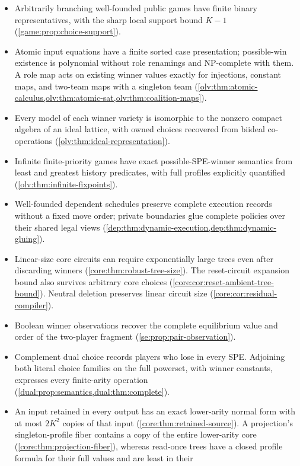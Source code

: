 \documentclass[11pt]{article}
\begin{document}
\begin{itemize}
\item Arbitrarily branching well-founded public games have finite binary
representatives, with the sharp local support bound $K-1$
(\cref{game:prop:choice-support}).
\item Atomic input equations have a finite sorted case presentation;
possible-win existence is polynomial without role renamings and NP-complete
with them. A role map acts on existing winner values exactly for injections,
constant maps, and two-team maps with a singleton team
(\cref{olv:thm:atomic-calculus,olv:thm:atomic-sat,olv:thm:coalition-maps}).
\item Every model of each winner variety is isomorphic to the nonzero
compact algebra of an ideal lattice, with owned choices recovered from
biideal co-operations (\cref{olv:thm:ideal-representation}).
\item Infinite finite-priority games have exact possible-SPE-winner
semantics from least and greatest history predicates, with full profiles
explicitly quantified (\cref{olv:thm:infinite-fixpoints}).
\item Well-founded dependent schedules preserve complete execution records
without a fixed move order; private boundaries glue complete policies
over their shared legal views
(\cref{dep:thm:dynamic-execution,dep:thm:dynamic-gluing}).
\item Linear-size core circuits can require exponentially large trees
even after discarding winners (\cref{core:thm:robust-tree-size}).
The reset-circuit expansion bound also survives arbitrary core choices
(\cref{core:cor:reset-ambient-tree-bound}).
Neutral deletion preserves linear circuit size
(\cref{core:cor:residual-compiler}).
\item Boolean winner observations recover the complete equilibrium value
and order of the two-player fragment (\cref{se:prop:pair-observation}).
\item Complement dual choice records players who lose in every SPE.
Adjoining both literal choice families on the full powerset, with
winner constants, expresses every finite-arity operation
(\cref{dual:prop:semantics,dual:thm:complete}).
\item An input retained in every output has an exact lower-arity normal
form with at most $2K^2$ copies of that input
(\cref{core:thm:retained-source}).
A projection's singleton-profile fiber contains a copy of the entire
lower-arity core (\cref{core:thm:projection-fiber}), whereas read-once trees
have a closed profile formula for their full values and are least in their

\end{itemize}
\end{document}
